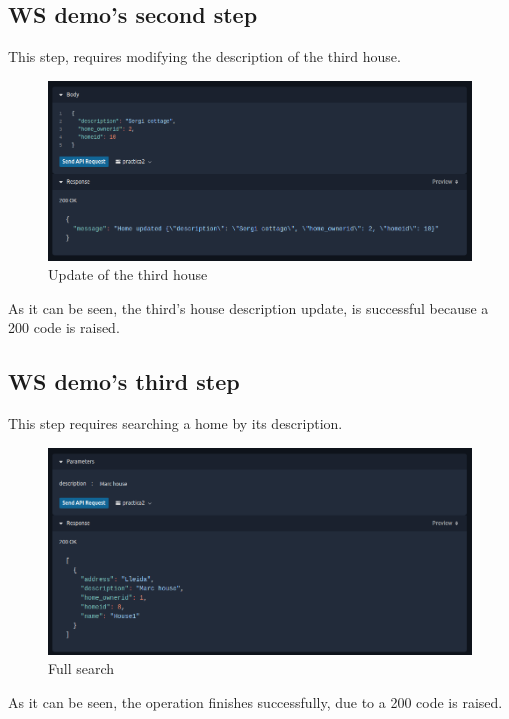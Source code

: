 \documentclass[a4paper,12pt]{article}
\begin{document}
\subsection*{WS demo's second step}
This step, requires modifying the description of the third house.
\begin{figure}[H]
    \centering
    \includegraphics[scale = 0.5]{images/House 3 update.png}
    \caption{Update of the third house}
    \label{fig:house3U}
\end{figure}
As it can be seen, the third's house description update, is successful because a 200 code is raised.
\subsection*{WS demo's third step}
This step requires searching a home by its description.
\begin{figure}[H]
    \centering
    \includegraphics[scale = 0.5]{images/Full search.png}
    \caption{Full search}
    \label{fig:full}
\end{figure}
As it can be seen, the operation finishes successfully, due to a 200 code is raised.
\end{document}

